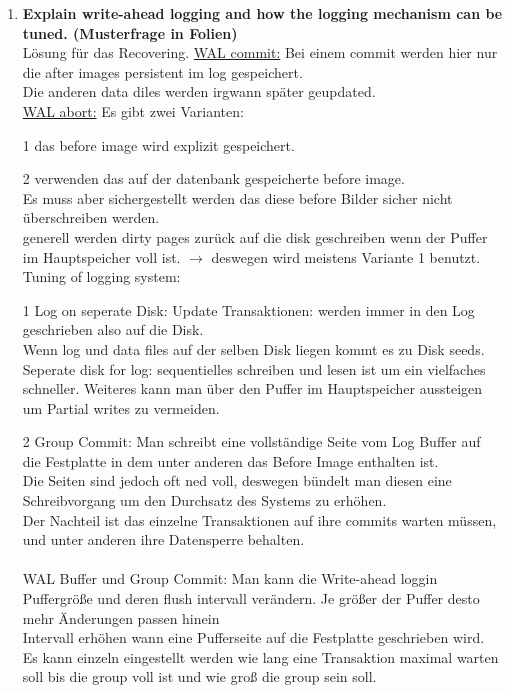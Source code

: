 \documentclass[12pt]{article}\pagestyle{myheadings}
\theoremstyle{plain}
\begin{document}
\begin{enumerate}
\begin{itemize}
\end{itemize}
\item \textbf{Explain write-ahead logging and how the logging mechanism can be tuned. (Musterfrage in Folien)} \\
Lösung für das Recovering.
\underline{WAL commit:} 
Bei einem commit werden hier nur die after images persistent im log gespeichert.\\
Die anderen data diles werden irgwann später geupdated.\\
\underline{WAL abort:}
Es gibt zwei Varianten:
\item[1] das before image wird explizit gespeichert. 
\item[2] verwenden das auf der datenbank gespeicherte before image.\\
Es muss aber sichergestellt werden das diese before Bilder sicher nicht überschreiben werden.\\generell werden dirty pages zurück auf die disk geschreiben wenn der Puffer im Hauptspeicher voll ist. $\rightarrow$ deswegen wird meistens Variante 1 benutzt.\\
Tuning of logging system:\\
\item[1] Log on seperate Disk:
Update Transaktionen: werden immer in den Log geschrieben also auf die Disk.\\
Wenn log und data files auf der selben Disk liegen kommt es zu Disk seeds.\\
Seperate disk for log: sequentielles schreiben und lesen ist um ein vielfaches schneller.
Weiteres kann man über den Puffer im Hauptspeicher aussteigen um Partial writes zu vermeiden.
\item[2]Group Commit: Man schreibt eine vollständige Seite vom Log Buffer auf die Festplatte in dem unter anderen das Before Image enthalten ist.\\
Die Seiten sind jedoch oft ned voll, deswegen bündelt man diesen eine Schreibvorgang um den Durchsatz des Systems zu erhöhen.\\
Der Nachteil ist das einzelne Transaktionen auf ihre commits warten müssen, und unter anderen ihre Datensperre behalten.\\ \\
WAL Buffer und Group Commit:
Man kann die Write-ahead loggin Puffergröße und deren flush intervall verändern. Je größer der Puffer desto mehr Änderungen passen hinein\\
Intervall erhöhen wann eine Pufferseite auf die Festplatte geschrieben wird.
Es kann einzeln eingestellt werden wie lang eine Transaktion maximal warten soll bis die group voll ist und wie groß die group sein soll.

\end{enumerate}
\end{document}
